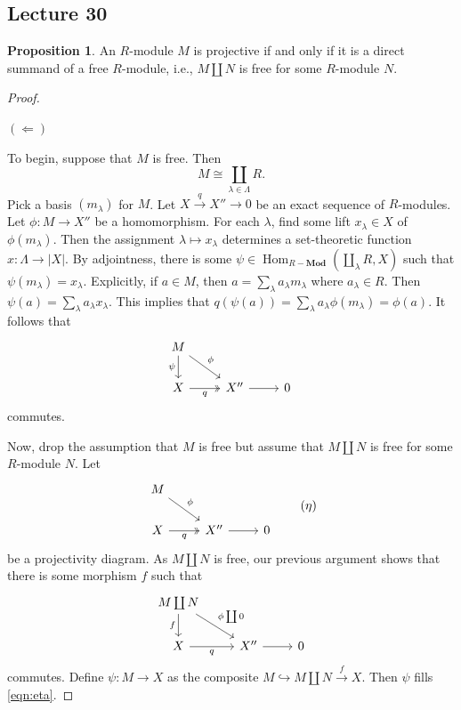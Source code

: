 \documentclass[10pt,letterpaper,cm]{nupset}
\theoremstyle{definition}
\theoremstyle{theorem}
\newtheorem{prop}[definition]{Proposition}
\theoremstyle{remark}
\newcommand{\1}{\mathbf{1}}
\newcommand{\0}{\vec 0}
\DeclareMathOperator{\Hom}{Hom}
\begin{document}
\subsection{Lecture 30}

\begin{prop}
An $R$-module $M$ is projective  if and only if it is a direct summand of a free $R$-module, i.e., $M \coprod N$ is free for some $R$-module $N$.
\end{prop}
\begin{proof} $ $

\smallskip


$(\Longleftarrow)$


To begin, suppose that $M$ is free. Then $$M \cong \coprod_{\lambda \in \Lambda} R.$$  Pick a basis $(m_{\lambda})$ for $M$. Let $X \overset{q}{\longrightarrow}  X'' \to 0$ be an exact sequence of $R$-modules. Let $\phi : M \to X''$ be a homomorphism. For each $\lambda$, find some lift $x_{\lambda}\in X$ of $\phi(m_{\lambda})$. Then the assignment $\lambda \mapsto x_{\lambda}$ determines a set-theoretic function $x : \Lambda \to \lvert{X}\rvert$. By adjointness, there is some $\psi \in \Hom_{R{-}\mathbf{Mod}}(\coprod_{\lambda} R, X)$ such that $\psi(m_{\lambda}) = x_{\lambda}$. Explicitly, if $a \in M$, then $a = \sum_{\lambda}a_{\lambda}m_{\lambda}$ where $a_{\lambda}\in R$. Then $\psi(a) = \sum_{\lambda} a_{\lambda}x_{\lambda}$. This implies that $q(\psi(a)) = \sum_{\lambda} a_{\lambda}\phi(m_{\lambda}) = \phi(a)$. It follows that \[
\begin{tikzcd}
M \arrow[rd, "\phi"] \arrow[d, "\psi"'] &  &  \\
X \arrow[r, "q"', two heads] & X'' \arrow[r] & 0
\end{tikzcd}
\] commutes.

\medskip

 Now, drop the assumption that $M$ is free but assume that $M \coprod N$ is free for some $R$-module $N$. Let 
\[ \label{eqn:eta}
\begin{tikzcd}
M \arrow[rd, "\phi"] &  &  \\
X \arrow[r, "q"', two heads] & X'' \arrow[r] & 0
\end{tikzcd} \tag{$\eta$}
\] be a projectivity diagram. As $M \coprod N$ is free, our previous argument shows that there is some morphism $f$ such that
\[\begin{tikzcd}
M\coprod N \arrow[rd, "\phi \coprod 0"] \arrow[d, "f"'] &  &  \\
X \arrow[r, "q"'] & X'' \arrow[r] & 0
\end{tikzcd}
\] commutes. Define $\psi : M \to X$  as the composite $M \hookrightarrow M\coprod N \overset{f}{\longrightarrow} X$. Then $\psi$ fills \eqref{eqn:eta}.


\end{proof}
\end{document}
